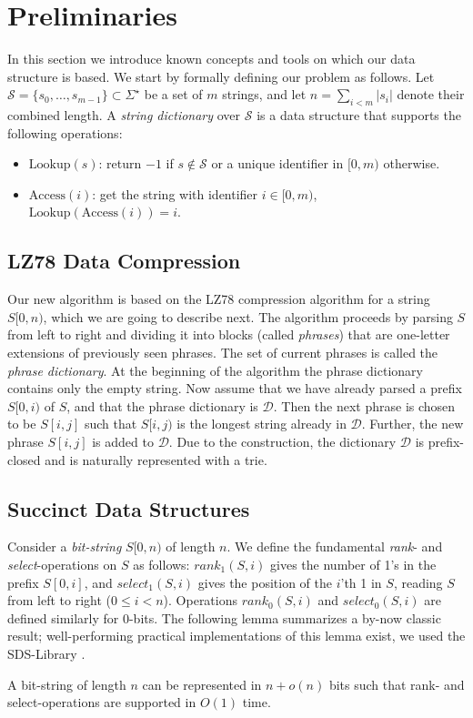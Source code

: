 \documentclass{llncs}
\newcommand{\strings}{\ensuremath{\mathcal{S}}}
\newcommand{\lookup}{\ensuremath{\text{Lookup}}}
\newcommand{\access}{\ensuremath{\text{Access}}}
\newcommand{\rank}{\ensuremath{\textit{rank}}}
\newcommand{\select}{\ensuremath{\textit{select}}}
\begin{document}
\section{Preliminaries}
\label{sect:prelims}
In this section we introduce known concepts and tools on which our data structure is based. We start by formally defining our problem as follows. Let $\strings = \{s_0,\dotsc,s_{m-1}\} \subset \Sigma^\star$ be a set of $m$ strings, and let $n=\sum_{i<m}|s_i|$ denote their combined length. A \emph{string dictionary} over $\strings$ is a data structure that supports the following operations:
\begin{itemize}
\item $\lookup(s)$: return $-1$ if $s\not\in\strings$ or a unique identifier in $[0,m)$ otherwise.
\item $\access(i)$: get the string with identifier $i\in[0,m)$, $\lookup(\access(i))=i$.
\end{itemize}

\subsection{LZ78 Data Compression}
\label{sect:lz}
Our new algorithm is based on the LZ78 compression algorithm \cite{ziv78compression} for a string $S[0,n)$, which we are going to describe next. The algorithm proceeds by parsing $S$ from left to right and dividing it into blocks (called \emph{phrases}) that are one-letter extensions of previously seen phrases. The set of current phrases is called the \emph{phrase dictionary}. At the beginning of the algorithm the phrase dictionary contains only the empty string. Now assume that we have already parsed a prefix $S[0,i)$ of $S$, and that the phrase dictionary is $\mathcal{D}$. Then the next phrase is chosen to be $S[i,j]$ such that $S[i,j)$ is the longest string already in $\mathcal{D}$. Further, the new phrase $S[i,j]$ is added to $\mathcal{D}$. Due to the construction, the dictionary $\mathcal{D}$ is prefix-closed and is naturally represented with a trie.

\subsection{Succinct Data Structures}
\label{sect:succinct}

Consider a \emph{bit-string} $S[0,n)$ of
length $n$. We define the fundamental \emph{rank}- and \emph{select}-operations on $S$ as follows:
$\rank_1(S,i)$ gives the number of 1's in the prefix $S[0,i]$, and $\select_1(S,i)$ gives the
position of the $i$'th 1 in $S$, reading $S$ from left to right ($0 \le i < n$). Operations
$\rank_0(S,i)$ and $\select_0(S,i)$ are defined similarly for 0-bits. The following lemma summarizes
a by-now classic result; well-performing practical implementations of this lemma exist, we used the SDS-Library \cite{sdsl}.
\begin{lemma}
\label{lem:fid}
A bit-string of length $n$ can be represented in $n+o(n)$ bits such that rank- and select-operations are supported in $O(1)$ time.
\end{lemma}
\end{document}
